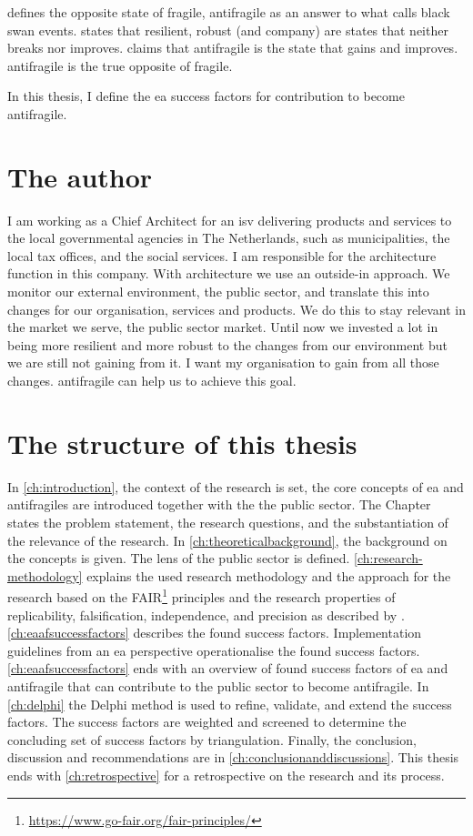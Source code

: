 \textcite{Taleb2012} defines the opposite state of \gls{fragile}, \gls{antifragile} as an answer to what \textcite{Taleb2008} calls black swan events. \textcite{Taleb2012} states that \gls{resilient}, \gls{robust} (and company) are states that neither breaks nor improves. \textcite{Taleb2012} claims that \gls{antifragile} is the state that gains and improves. \Gls{antifragile} is the true opposite of \gls{fragile}.

In this thesis, I define the \acrfull{ea} success factors for contribution to become \gls{antifragile}.

\section{The author}
\label{sec:context}
I am working as a Chief Architect for an \acrfull{isv} delivering products and services to the local governmental agencies in The Netherlands, such as municipalities, the local tax offices, and the social services. I am responsible for the architecture function in this company. With architecture we use an outside-in approach. We monitor our external environment, the public sector, and translate this into changes for our organisation, services and products. We do this to stay relevant in the market we serve, the public sector market. Until now we invested a lot in being more resilient and more robust to the changes from our environment but we are still not gaining from it. I want my organisation to gain from all those changes. \Gls{antifragile} can help us to achieve this goal.

\section{The structure of this thesis}
\label{sec:structure}
In \cref{ch:introduction}, the context of the research is set, the core concepts of \acrshort{ea} and \glspl{antifragile} are introduced together with the the public sector. The Chapter states the problem statement, the research questions, and the substantiation of the relevance of the research. In \cref{ch:theoreticalbackground}, the background on the concepts is given. The lens of the public sector is defined. \cref{ch:research-methodology} explains the used research methodology and the approach for the research based on the FAIR\footnote{\url{https://www.go-fair.org/fair-principles/}} principles and the research properties of replicability, falsification, independence, and precision as described by \textcite{Recker2013}. \cref{ch:eaafsuccessfactors} describes the found success factors. Implementation guidelines from an \acrshort{ea} perspective operationalise the found success factors. \cref{ch:eaafsuccessfactors} ends with an overview of found success factors of \acrshort{ea} and \gls{antifragile} that can contribute to the public sector to become \gls{antifragile}. In \cref{ch:delphi} the Delphi method is used to refine, validate, and extend the success factors. The success factors are weighted and screened to determine the concluding set of success factors by triangulation. Finally, the conclusion, discussion and recommendations are in \cref{ch:conclusionanddiscussions}. This thesis ends with \cref{ch:retrospective} for a retrospective on the research and its process.

